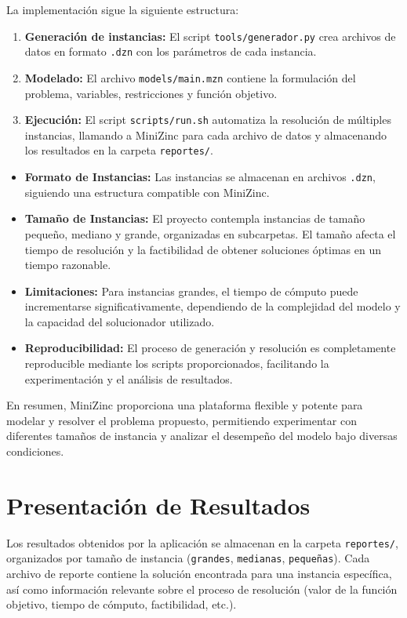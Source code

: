 \documentclass[a4paper,12pt]{article}
\begin{document}
La implementación sigue la siguiente estructura:
\begin{enumerate}
    \item \textbf{Generación de instancias:} El script \texttt{tools/generador.py} crea archivos de datos en formato \texttt{.dzn} con los parámetros de cada instancia.
    \item \textbf{Modelado:} El archivo \texttt{models/main.mzn} contiene la formulación del problema, variables, restricciones y función objetivo.
    \item \textbf{Ejecución:} El script \texttt{scripts/run.sh} automatiza la resolución de múltiples instancias, llamando a MiniZinc para cada archivo de datos y almacenando los resultados en la carpeta \texttt{reportes/}.
\end{enumerate}

\begin{itemize}
    \item \textbf{Formato de Instancias:} Las instancias se almacenan en archivos \texttt{.dzn}, siguiendo una estructura compatible con MiniZinc.
    \item \textbf{Tamaño de Instancias:} El proyecto contempla instancias de tamaño pequeño, mediano y grande, organizadas en subcarpetas. El tamaño afecta el tiempo de resolución y la factibilidad de obtener soluciones óptimas en un tiempo razonable.
    \item \textbf{Limitaciones:} Para instancias grandes, el tiempo de cómputo puede incrementarse significativamente, dependiendo de la complejidad del modelo y la capacidad del solucionador utilizado.
    \item \textbf{Reproducibilidad:} El proceso de generación y resolución es completamente reproducible mediante los scripts proporcionados, facilitando la experimentación y el análisis de resultados.
\end{itemize}

En resumen, MiniZinc proporciona una plataforma flexible y potente para modelar y resolver el problema propuesto, permitiendo experimentar con diferentes tamaños de instancia y analizar el desempeño del modelo bajo diversas condiciones.

\section{Presentación de Resultados}
Los resultados obtenidos por la aplicación se almacenan en la carpeta \texttt{reportes/}, organizados por tamaño de instancia (\texttt{grandes}, \texttt{medianas}, \texttt{pequeñas}). Cada archivo de reporte contiene la solución encontrada para una instancia específica, así como información relevante sobre el proceso de resolución (valor de la función objetivo, tiempo de cómputo, factibilidad, etc.).
\end{document}
